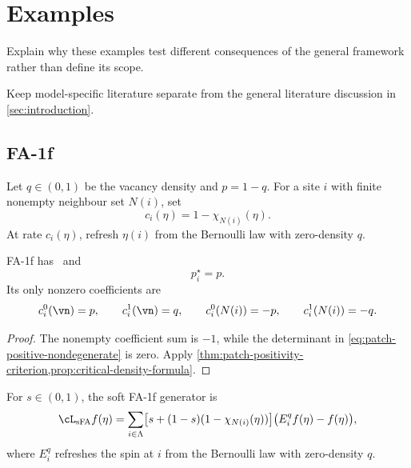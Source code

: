 \section{Examples}
\label{sec:examples}

\begin{discussion}
  \item Explain why these examples test different consequences of the
  general framework rather than define its scope.
  \item Keep model-specific literature separate from the general
  literature discussion in \cref{sec:introduction}.
\end{discussion}

\subsection{FA-1f}

\begin{definition}[FA-1f]
\label{def:fa-1f}
Let \(q\in(0,1)\) be the vacancy density and \(p=1-q\). For a site
\(i\) with finite nonempty neighbour set \(N(i)\), set
\[
  c_i(\eta)
  =
  1-\chi_{N(i)}(\eta).
\]
At rate \(c_i(\eta)\), refresh \(\eta(i)\) from the Bernoulli law with
zero-density \(q\).
\end{definition}

\begin{proposition}
\label{prop:fa-patch-parameters}
FA-1f has \patchpositivity\ and
\[
  p_i^\star=p.
\]
Its only nonzero coefficients are
\[
  c_i^0(\vn)=p,
  \qquad
  c_i^1(\vn)=q,
  \qquad
  c_i^0(N(i))=-p,
  \qquad
  c_i^1(N(i))=-q.
\]
\end{proposition}

\begin{proof}
The nonempty coefficient sum is \(-1\), while the determinant in
\eqref{eq:patch-positive-nondegenerate} is zero. Apply
\cref{thm:patch-positivity-criterion,prop:critical-density-formula}.
\end{proof}

\begin{definition}[Soft FA-1f]
\label{def:soft-fa-1f}
For \(s\in(0,1)\), the soft FA-1f generator is
\begin{equation}
  \cL_{\mathrm{sFA}}f(\eta)
  =
  \sum_{i\in\Lambda}
  \bigl[s+(1-s)(1-\chi_{N(i)}(\eta))\bigr]
  \bigl(E_i^qf(\eta)-f(\eta)\bigr),
  \label{eq:soft-fa-generator}
\end{equation}
where \(E_i^q\) refreshes the spin at \(i\) from the Bernoulli law
with zero-density \(q\).
\end{definition}

